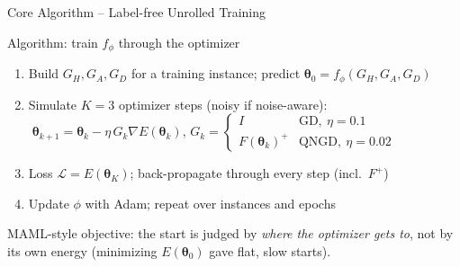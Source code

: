 \documentclass[aspectratio=169,11pt]{beamer}
\begin{document}
\begin{frame}{Core Algorithm -- Label-free Unrolled Training}
  \begin{block}{Algorithm: train $f_\phi$ through the optimizer}
    \begin{enumerate}
      \item Build $G_H,G_A,G_D$ for a training instance; predict $\boldsymbol\theta_0=f_\phi(G_H,G_A,G_D)$
      \item Simulate $K=3$ optimizer steps (noisy if noise-aware):
            $\;\boldsymbol\theta_{k+1}=\boldsymbol\theta_k-\eta\,G_k\nabla E(\boldsymbol\theta_k)$,
            \quad $G_k=\begin{cases} I & \text{GD},\ \eta=0.1\\ F(\boldsymbol\theta_k)^{+} & \text{QNGD},\ \eta=0.02\end{cases}$
      \item Loss $\mathcal{L}=E(\boldsymbol\theta_K)$; back-propagate through every step (incl.\ $F^{+}$)
      \item Update $\phi$ with Adam; repeat over instances and epochs
    \end{enumerate}
  \end{block}
  \small MAML-style objective: the start is judged by \emph{where the optimizer gets to}, not by its own energy
  (minimizing $E(\boldsymbol\theta_0)$ gave flat, slow starts).
\end{frame}
\end{document}
